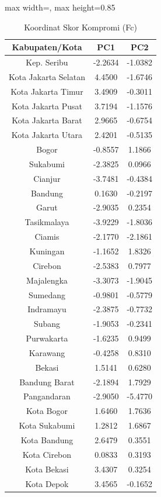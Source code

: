 \begin{table}[H]
\centering
\caption{Koordinat Skor Kompromi (Fc)} \label{tab:scores}
\begin{adjustbox}{max width=\textwidth, max height=0.85\textheight}
\begin{tabular}{|c|c|c|}
\hline
\textbf{Kabupaten/Kota} & \textbf{PC1} & \textbf{PC2} \\
\hline
Kep. Seribu & -2.2634 & -1.0382 \\
Kota Jakarta Selatan & 4.4500 & -1.6746 \\
Kota Jakarta Timur & 3.4909 & -0.3011 \\
Kota Jakarta Pusat & 3.7194 & -1.1576 \\
Kota Jakarta Barat & 2.9665 & -0.6754 \\
Kota Jakarta Utara & 2.4201 & -0.5135 \\
Bogor & -0.8557 & 1.1866 \\
Sukabumi & -2.3825 & 0.0966 \\
Cianjur & -3.7481 & -0.4384 \\
Bandung & 0.1630 & -0.2197 \\
Garut & -2.9035 & 0.2354 \\
Tasikmalaya & -3.9229 & -1.8036 \\
Ciamis & -2.1770 & -2.1861 \\
Kuningan & -1.1652 & 1.8326 \\
Cirebon & -2.5383 & 0.7977 \\
Majalengka & -3.3073 & -1.9045 \\
Sumedang & -0.9801 & -0.5779 \\
Indramayu & -2.3875 & -0.7732 \\
Subang & -1.9053 & -0.2341 \\
Purwakarta & -1.6235 & 0.9499 \\
Karawang & -0.4258 & 0.8310 \\
Bekasi & 1.5141 & 0.6280 \\
Bandung Barat & -2.1894 & 1.7929 \\
Pangandaran & -2.9050 & -5.4770 \\
Kota Bogor & 1.6460 & 1.7636 \\
Kota Sukabumi & 1.2812 & 1.6867 \\
Kota Bandung & 2.6479 & 0.3551 \\
Kota Cirebon & 0.0833 & 0.3193 \\
Kota Bekasi & 3.4307 & 0.3254 \\
Kota Depok & 3.4565 & -0.1652 \\

\end{tabular}
\end{adjustbox}
\end{table}
